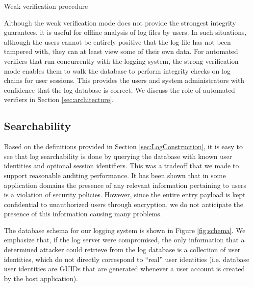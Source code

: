 \documentclass{sig-alternate}
\begin{document}
\begin{algorithm}[ht!] %
\caption{Weak verification procedure} \label{alg:weakVerify}
\begin{algorithmic}[1]

\ENDFOR
{}
\end{algorithmic}
\end{algorithm}

Although the weak verification mode does not provide the strongest integrity guarantees, it
is useful for offline analysis of log files by users. In such situations, although the users 
cannot be entirely positive that the log file has not been tampered with, they can at least 
view some of their own data. For automated verifiers that run concurrently with the logging system, 
the strong verification mode enables them to walk the database to perform integrity 
checks on log chains for user sessions. This provides the users and system administrators 
with confidence that the log database is correct. We discuss the role of automated
verifiers in Section \ref{sec:architecture}.

\subsection{Searchability}
Based on the definitions provided in Section \ref{sec:LogConstruction}, it is easy to 
see that log searchability is done by querying the database with known user identities and optional session 
identifiers. This was a tradeoff that we made to support reasonable auditing performance. 
It has been shown that in some application domains the presence of any relevant information
pertaining to users is a violation of security policies. However, since the entire entry payload
is kept confidential to unauthorized users through encryption, we do not anticipate the presence 
of this information causing many problems. 

The database schema for our logging system is shown in Figure \ref{fig:schema}. We emphasize that, 
if the log server were compromised, the only information that a determined attacker could retrieve from
the log database is a collection of user identities, which do not directly correspond to ``real'' user
identities (i.e. database user identities are GUIDs that are generated whenever a user account is created
by the host application). 
\end{document}
